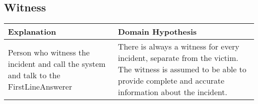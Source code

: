 \subsection{\og Witness \fg}

\begin{tabularx}{\textwidth}{|X|X|} \hline
Explanation & Domain Hypothesis\\ \hline
Person who witness the incident and call the system and talk to the FirstLineAnswerer
& There is always a witness for every incident, separate from the victim.  The witness is assumed to be able to provide complete and accurate information about the incident. \\ \hline
\end{tabularx}
